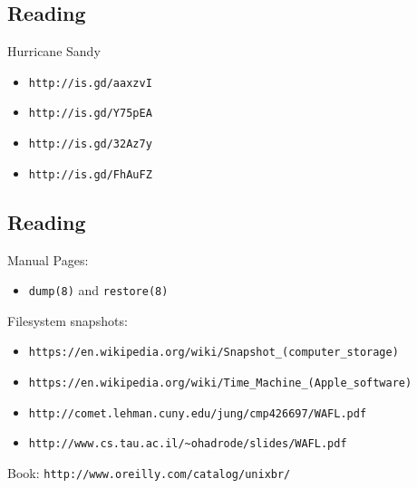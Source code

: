 \documentclass[xga]{xdvislides}
\begin{document}
\subsection{Reading}
Hurricane Sandy
\begin{itemize}
	\item \verb+http://is.gd/aaxzvI+
	\item \verb+http://is.gd/Y75pEA+
	\item \verb+http://is.gd/32Az7y+
	\item \verb+http://is.gd/FhAuFZ+
\end{itemize}

\subsection{Reading}
Manual Pages:
\begin{itemize}
	\item \verb+dump(8)+ and \verb+restore(8)+
\end{itemize}
Filesystem snapshots:
\begin{itemize}
	\item \verb+https://en.wikipedia.org/wiki/Snapshot_(computer_storage)+
	\item \verb+https://en.wikipedia.org/wiki/Time_Machine_(Apple_software)+
	\item \verb+http://comet.lehman.cuny.edu/jung/cmp426697/WAFL.pdf+
	\item \verb+http://www.cs.tau.ac.il/~ohadrode/slides/WAFL.pdf+
\end{itemize}
\vspace{.5in}
Book: \verb+http://www.oreilly.com/catalog/unixbr/+
\end{document}
